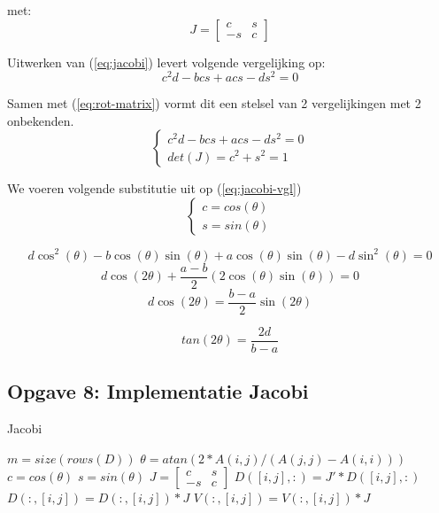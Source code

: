 \documentclass[a4paper]{article}
\newcommand{\opgave}[1]{\subsection{Opgave #1}}
\begin{document}
met: $$J = \begin{bmatrix}
c & s \\ -s & c
\end{bmatrix}$$

Uitwerken van (\ref{eq:jacobi}) levert volgende vergelijking op:
\begin{equation} \label{eq:jacobi-vgl}
c^2d-bcs+acs-ds^2 = 0
\end{equation}

Samen met (\ref{eq:rot-matrix}) vormt dit een stelsel van 2 vergelijkingen met 2 onbekenden.
\begin{equation}
\begin{cases}
c^2d-bcs+acs-ds^2 = 0 \\ det(J) = c^2 + s^2 = 1
\end{cases}
\end{equation}

We voeren volgende substitutie uit op (\ref{eq:jacobi-vgl})
\begin{equation}
\begin{cases}
c = cos(\theta) \\ s = sin(\theta)
\end{cases}
\end{equation}

$$ d \cos^2(\theta) - b \cos(\theta) \sin(\theta) + a \cos(\theta) \sin(\theta) - d \sin^2(\theta) = 0$$
$$ d \cos(2\theta) + \frac{a-b}{2}(2 \cos(\theta)\sin(\theta)) = 0 $$
$$ d \cos(2\theta) = \frac{b-a}{2}\sin(2\theta)$$

\begin{equation}
tan(2\theta) = \frac{2d}{b-a}
\end{equation}

\opgave{8: Implementatie Jacobi}\label{sec:oef8}

\begin{algorithm}
\begin{algorithmic}[H]\label{alg:SI}\caption{Jacobi}
\State $m = size(rows(D))$
\State $\theta = atan(2*A(i,j)/(A(j,j) - A(i,i)))$
\State $c = cos(\theta)$
\State $s = sin(\theta)$
\State $J = \begin{bmatrix}c & s \\ -s & c \end{bmatrix}$
\State $D([i, j], :) = J' * D([i, j], :)$
\State $D(:, [i, j]) = D(:, [i, j]) * J$
\State $V(:, [i, j]) = V(:, [i, j]) * J$
\EndFor
\EndFor
\EndWhile
\end{algorithmic}
\end{algorithm}
\end{document}
